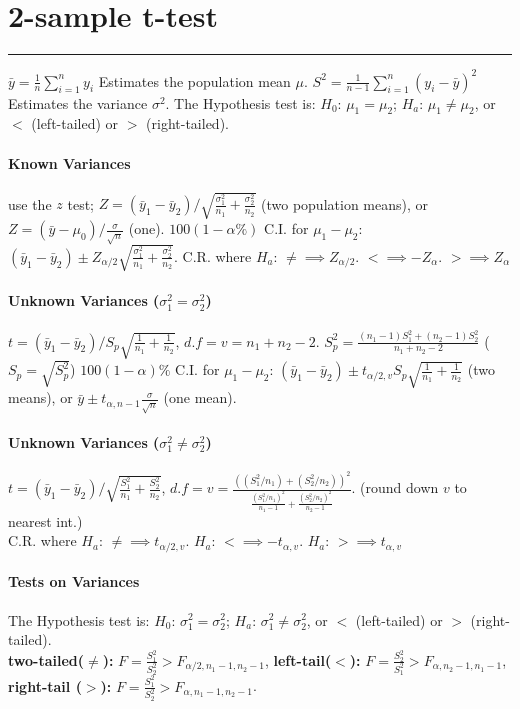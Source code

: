 \documentclass[10pt]{article}
\begin{document}
\section*{2-sample t-test}
\hrule width 10cm
\vspace{6pt}
$\bar{y} = \frac{1}{n} \sum_{i=1}^{n} y_i$ Estimates the population mean $\mu$. $S^2 = \frac{1}{n-1}\sum_{i=1}^{n} (y_i - \bar{y})^2$ Estimates the variance $\sigma^2$. 
The Hypothesis test is:     $H_0$: $\mu_1 = \mu_2$; $H_a$: $\mu_1 \neq \mu_2$, or $<$ (left-tailed) or $>$ (right-tailed).
\paragraph{Known Variances} use the $z$ test; $Z = (\bar{y}_1 - \bar{y}_2) / \sqrt{\frac{\sigma_1^2}{n_1} + \frac{\sigma_2^2}{n_2}}$ (two population means), or $Z = (\bar{y} - \mu_0) / \frac{\sigma}{\sqrt{n}}$ (one). 
$100(1-\alpha\%)$ C.I. for $\mu_1 - \mu_2$: $(\bar{y}_1 - \bar{y}_2) \pm Z_{\alpha/2}\sqrt{\frac{\sigma_1^2}{n_1} + \frac{\sigma_2^2}{n_2}}$. 
C.R. where $H_a$: $\neq \implies Z_{\alpha / 2}$. $< \implies -Z_{\alpha}$. $> \implies Z_{\alpha}$  
\paragraph{Unknown Variances ($\sigma_1^2 = \sigma_2^2$)} $t = (\bar{y}_1 - \bar{y}_2) / S_p \sqrt{\frac{1}{n_1} + \frac{1}{n_2}}$, $d.f = v = n_1 + n_2 - 2$. $S_p^2 = \frac{(n_1 - 1)S_1^2 + (n_2 - 1)S_2^2}{n_1 + n_2 - 2}$ ($S_p = \sqrt{S_p^2}$)
$100(1-\alpha)\%$ C.I. for $\mu_1 - \mu_2$: $(\bar{y}_1 - \bar{y}_2) \pm t_{\alpha/2, v}S_p \sqrt{\frac{1}{n_1} + \frac{1}{n_2}}$ (two means), or $\bar{y} \pm t_{\alpha,n-1}\frac{\sigma}{\sqrt{n}}$ (one mean).
\paragraph{Unknown Variances ($\sigma_1^2 \neq \sigma_2^2$)} $t = (\bar{y}_1 - \bar{y}_2) / \sqrt{\frac{S_1^2}{n_1} + \frac{S_2^2}{n_2}}$, $d.f = v = \frac{((S_1^2/n_1) + (S_2^2/n_2))^2}{\frac{(S_1^2/n_1)^2}{n_1 - 1} + \frac{(S_2^2/n_2)^2}{n_2 - 1}}$. (round down $v$ to nearest int.) \\
C.R. where $H_a$: $\neq \implies t_{\alpha / 2, v}$. $H_a$: $< \implies -t_{\alpha, v}$. $H_a$: $> \implies t_{\alpha, v}$ 
\paragraph{Tests on Variances}
The Hypothesis test is:     $H_0$: $\sigma_1^2 = \sigma_2^2$; $H_a$: $\sigma_1^2 \neq \sigma_2^2$, or $<$ (left-tailed) or $>$ (right-tailed).\\
\textbf{two-tailed($\neq$):} $F = \frac{S_1^2}{S_2^2} > F_{\alpha/2, n_1 - 1, n_2 - 1}$, 
\textbf{left-tail($<$):} $F = \frac{S_2^2}{S_1^2} > F_{\alpha, n_2 - 1, n_1 - 1}$, 
\textbf{right-tail ($>$):} $F = \frac{S_1^2}{S_2^2} > F_{\alpha, n_1 - 1, n_2 - 1}$.
\end{document}

